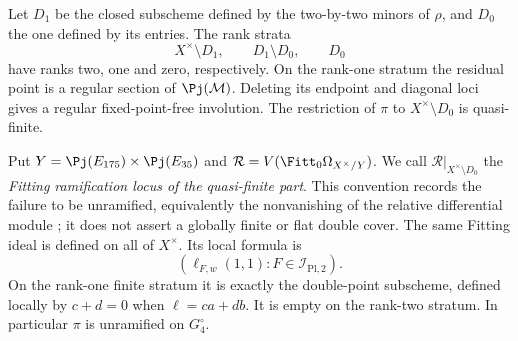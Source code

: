 \begin{proposition}
\label{prop:global-pencil-rank-strata}
Let \(D_1\) be the closed subscheme defined by the two-by-two
minors of \(\rho\), and \(D_0\) the one defined by its
entries.  The rank strata
\[
 X^\times\setminus D_1,\qquad D_1\setminus D_0,\qquad D_0
\]
have ranks two, one and zero, respectively.  On the rank-one stratum
the residual point is a regular section of \(\Pj(\mathcal M)\).
Deleting its endpoint and diagonal loci gives a regular fixed-point-free
involution.  The restriction of \(\pi\) to
\(X^\times\setminus D_0\) is quasi-finite.

Put \(Y=\Pj(E_{175})\times\Pj(E_{35})\) and
\(\mathcal R=V(\Fitt_0\Omega_{X^\times/Y})\).  We call
\(\mathcal R|_{X^\times\setminus D_0}\) the \emph{Fitting
ramification locus of the quasi-finite part}.  This convention
records the failure to be unramified, equivalently the nonvanishing
of the relative differential module \cite[Lemma~29.36.14]{StacksUnramified};
it does not assert a globally finite or flat double cover.
The same Fitting ideal is defined on all of \(X^\times\).
Its local formula is
\begin{equation}\label{eq:ramification-evaluation-ideal}
              (\ell_{F,w}(1,1):F\in\mathcal I_{\mathrm{Pl},2}).
\end{equation}
On the rank-one finite stratum it is exactly the double-point
subscheme, defined locally by \(c+d=0\) when
\(\ell=ca+db\).  It is empty on the rank-two stratum.  In
particular \(\pi\) is unramified on \(G_4^\circ\).
\end{proposition}
